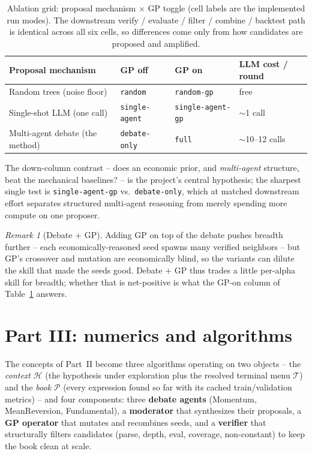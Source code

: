 \documentclass[11pt]{article}
\theoremstyle{definition}
\theoremstyle{plain}
\theoremstyle{remark}
\newtheorem{remark}{Remark}[section]
\newcommand{\Term}{\mathcal{T}}
\begin{document}
\begin{table}[h]
\centering
\small
\begin{tabular}{@{}llll@{}}
\toprule
Proposal mechanism & GP off & GP on & LLM cost / round \\
\midrule
Random trees (noise floor)      & \texttt{random}        & \texttt{random-gp}        & free \\
Single-shot LLM (one call)      & \texttt{single-agent}  & \texttt{single-agent-gp}  & $\sim$1 call \\
Multi-agent debate (the method) & \texttt{debate-only}   & \texttt{full}             & $\sim$10--12 calls \\
\bottomrule
\end{tabular}
\caption{Ablation grid: proposal mechanism $\times$ GP toggle (cell labels are the implemented
run modes). The downstream verify / evaluate / filter / combine / backtest path is identical
across all six cells, so differences come only from how candidates are proposed and amplified.}
\label{tab:ablation}
\end{table}

The down-column contrast -- does an economic prior, and \emph{multi-agent} structure, beat the
mechanical baselines? -- is the project's central hypothesis; the sharpest single test is
\texttt{single-agent-gp} vs.\ \texttt{debate-only}, which at matched downstream effort separates
structured multi-agent reasoning from merely spending more compute on one proposer.

\begin{remark}[Debate $+$ GP]
Adding GP on top of the debate pushes breadth further -- each economically-reasoned seed spawns
many verified neighbors -- but GP's crossover and mutation are economically blind, so the
variants can dilute the skill that made the seeds good. Debate $+$ GP thus trades a little
per-alpha skill for breadth; whether that is net-positive is what the GP-on column of
Table~\ref{tab:ablation} answers.
\end{remark}

\section{Part III: numerics and algorithms}
\label{sec:numerics}

The concepts of Part~II become three algorithms operating on two objects -- the \emph{context}
$\mathcal{H}$ (the hypothesis under exploration plus the resolved terminal menu $\Term$) and the
\emph{book} $\mathcal{P}$ (every expression found so far with its cached train/validation
metrics) -- and four components: three \textbf{debate agents} (Momentum, MeanReversion,
Fundamental), a \textbf{moderator} that synthesizes their proposals, a \textbf{GP operator} that
mutates and recombines seeds, and a \textbf{verifier} that structurally filters candidates
(parse, depth, eval, coverage, non-constant) to keep the book clean at scale.
\end{document}

